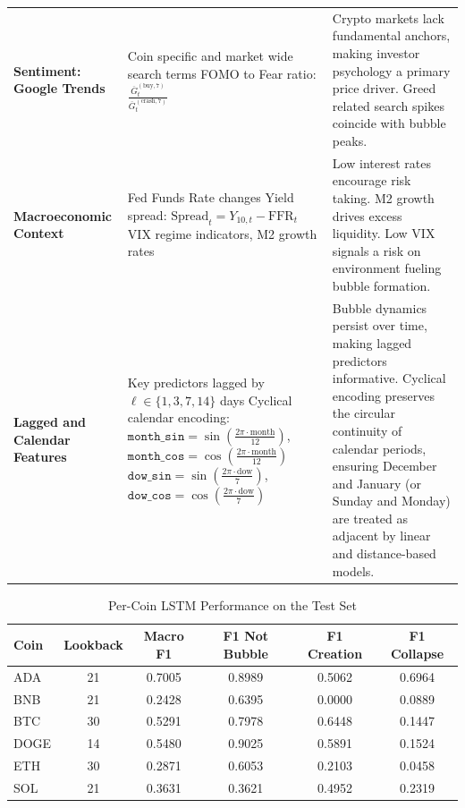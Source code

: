 \documentclass[12pt,a4paper]{article}
\begin{document}
\begin{table}[h]
\begin{tabular}{p{2.5cm} p{5.2cm} p{6.5cm}}
\textbf{Sentiment: Google Trends} & 
Coin specific and market wide search terms \newline
FOMO to Fear ratio: $\frac{\overline{G}_t^{(\text{buy},7)}}{\overline{G}_t^{(\text{crash},7)}}$ & 
Crypto markets lack fundamental anchors, making investor psychology a primary price driver. Greed related search spikes coincide with bubble peaks. \\

\textbf{Macroeconomic Context} & 
Fed Funds Rate changes \newline
Yield spread: $\text{Spread}_t = Y_{10,t} - \text{FFR}_t$ \newline
VIX regime indicators, M2 growth rates & 
Low interest rates encourage risk taking. M2 growth drives excess liquidity. Low VIX signals a risk on environment fueling bubble formation. \\

\textbf{Lagged and Calendar Features} &
Key predictors lagged by $\ell \in \{1,3,7,14\}$ days \newline
Cyclical calendar encoding: \newline
$\texttt{month\_sin} = \sin\!\left(\frac{2\pi \cdot \text{month}}{12}\right)$,\; $\texttt{month\_cos} = \cos\!\left(\frac{2\pi \cdot \text{month}}{12}\right)$ \newline
$\texttt{dow\_sin} = \sin\!\left(\frac{2\pi \cdot \text{dow}}{7}\right)$,\; $\texttt{dow\_cos} = \cos\!\left(\frac{2\pi \cdot \text{dow}}{7}\right)$ &
Bubble dynamics persist over time, making lagged predictors informative. Cyclical encoding preserves the circular continuity of calendar periods, ensuring December and January (or Sunday and Monday) are treated as adjacent by linear and distance-based models. \\

\bottomrule
\end{tabular}
\end{table}


\begin{table}[h]
\centering
\small
\caption{Per-Coin LSTM Performance on the Test Set}
\label{tab:lstm_per_coin}
\begin{tabular}{lccccc}
\toprule
Coin & Lookback & Macro F1 & F1 Not Bubble & F1 Creation & F1 Collapse \\
\midrule
ADA  & 21 & 0.7005 & 0.8989 & 0.5062 & 0.6964 \\
BNB  & 21 & 0.2428 & 0.6395 & 0.0000 & 0.0889 \\
BTC  & 30 & 0.5291 & 0.7978 & 0.6448 & 0.1447 \\
DOGE & 14 & 0.5480 & 0.9025 & 0.5891 & 0.1524 \\
ETH  & 30 & 0.2871 & 0.6053 & 0.2103 & 0.0458 \\
SOL  & 21 & 0.3631 & 0.3621 & 0.4952 & 0.2319 \\
\bottomrule
\end{tabular}
\end{table}
\end{document}
